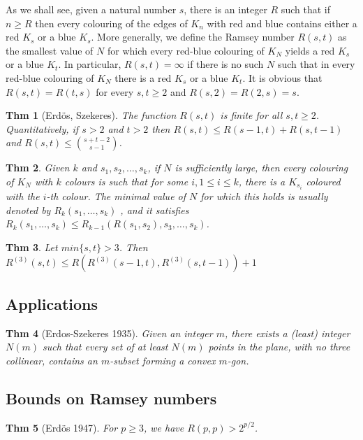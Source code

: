 \documentclass[11pt, fleqn, a4paper, landscape]{article}
\theoremstyle{plain} %
\newtheorem{thm}{Thm}
\theoremstyle{remark} %
\theoremstyle{definition} %
\begin{document}
\begin{multicols}{5}
As we shall see, given a natural number $s$, there is an integer $R$ such that if $n \ge R$ then every colouring of the edges of $K_n$ with red and blue contains either a red $K_s$ or a blue $K_s$. More generally, we define the Ramsey number $R(s, t)$ as the smallest value of $N$ for which every red-blue colouring of $K_N$ yields a red $K_s$ or a blue $K_t$. In particular, $R(s, t) = \infty$ if there is no such $N$ such that in every red-blue
colouring of $K_N$ there is a red $K_s$ or a blue $K_t$. It is obvious that
$ R(s, t) = R(t, s)$ for every $s, t \ge 2$ and $R(s, 2) = R(2, s) = s$. 

\begin{thm}[Erdös, Szekeres]
The function $R(s, t)$ is finite for all $s, t \ge 2$. Quantitatively, if $s > 2 $ and $t > 2$ then $R(s, t)\le R(s - 1, t) + R(s, t - 1)$ and $R(s, t) \le \binom{s+t-2}{s-1}$.
\end{thm}

\begin{thm}
Given $k$ and $s_1, s_2, \dots , s_k$, if $N$ is sufficiently large, then every colouring of $K_N$ with $k$ colours is such that for some $i, 1 \le i \le k$, there is a $K_{s_i}$ coloured with the $i$-th colour. The
minimal value of $N$ for which this holds is usually denoted by $R_k(s_1, \dots , s_k)$ , and it satisfies $R_k(s_1, \dots , s_k)\le R_{k-1}(R(s_1, s_2), s_3, \dots , s_k)$.
\end{thm}

\begin{thm}
Let $min\{s, t\} > 3$. Then
$R^{(3)}(s, t) \le R(R^{(3)}(s - 1, t),R^{(3)}(s, t - 1)) + 1$
\end{thm}

\subsection{Applications}

\begin{thm}[Erdos-Szekeres 1935]
Given an integer $m$, there exists a (least) integer $N(m)$ such
that every set of at least $N(m)$ points in the plane, with no three collinear, contains an $m$-subset forming a convex $m$-gon.
\end{thm}
\subsection{Bounds on Ramsey numbers}

\begin{thm}[Erdös 1947]
For $p \ge 3$, we have $R(p, p) > 2^{p/2}$.
\end{thm}


\end{multicols}
\end{document}
